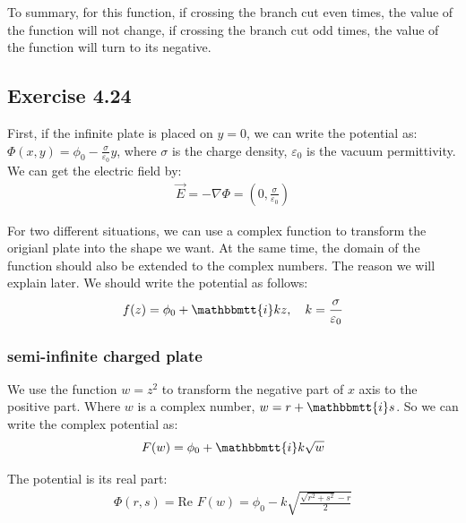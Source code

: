\documentclass[]{ctexart}
\newcommand{\mi}{\mathbbmtt{i}}
\begin{document}
		To summary, for this function, if crossing the branch cut even times, the value of the function will not change, if crossing the branch cut odd times, the value of the function will turn to its negative. 
	
	\subsection{Exercise 4.24}
		First, if the infinite plate is placed on $y=0$, we can write the potential as: $\Phi(x,y)=\phi_0 -\frac{\sigma}{\varepsilon_0}y$, where $\sigma$ is the charge density, $\varepsilon_0$ is the vacuum permittivity. We can get the electric field by:
			\begin{equation*}
			\begin{aligned}
				\vec{E}=-\nabla \Phi =(0, \frac{\sigma}{\varepsilon_0})
			\end{aligned}
			\end{equation*}
		
		For two different situations, we can use a complex function to transform the origianl plate into the shape we want. At the same time, the domain of the function should also be extended to the complex numbers. The reason we will explain later. We should write the potential as follows:
			\begin{equation*}
			\begin{aligned}
				f(z)=\phi_0+\mi k z, \quad k=\frac{\sigma}{\varepsilon_0}
			\end{aligned}	
			\end{equation*}
		
			\subsubsection{semi-infinite charged plate}
				We use the function $w=z^2$ to transform the negative part of $x$ axis to the positive part. Where $w$ is a complex number, $w=r+\mi s$. So we can write the complex potential as:
					\begin{equation*}
					\begin{aligned}
						F(w)=\phi_0+\mi k \sqrt{w}
					\end{aligned}
					\end{equation*}
				
				The potential is its real part:
					\begin{equation*}
					\begin{aligned}
						\Phi(r,s)=\text{Re }F(w)=\phi_0-k \sqrt{\frac{\sqrt{r^2+s^2}-r}{2}}
					\end{aligned}
					\end{equation*}
				
\end{document}
